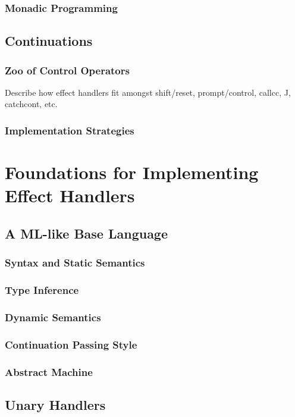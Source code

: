 \documentclass[11pt,phd,lfcs,twoside,openright,logo,leftchapter,normalheadings]{infthesis}
\begin{document}
\section{Monadic Programming}

\chapter{Continuations}
\label{ch:continuations}

\section{Zoo of Control Operators}
Describe how effect handlers fit amongst shift/reset, prompt/control,
callcc, J, catchcont, etc.

\section{Implementation Strategies}


\part{Foundations for Implementing Effect Handlers}

\chapter{A ML-like Base Language}
\section{Syntax and Static Semantics}
\section{Type Inference}
\section{Dynamic Semantics}
\section{Continuation Passing Style}
\section{Abstract Machine}

\chapter{Unary Handlers}
\label{ch:deep-handlers}
\end{document}

